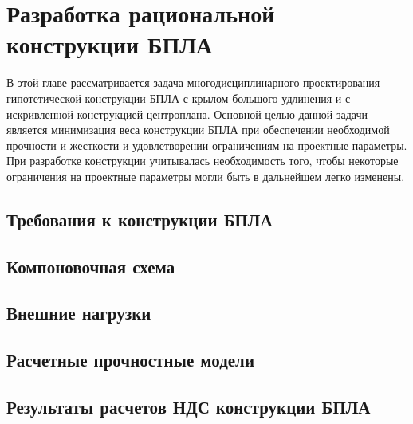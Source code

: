 \chapter{Разработка рациональной конструкции БПЛА}

В этой главе рассматривается задача многодисциплинарного проектирования гипотетической конструкции БПЛА с крылом большого удлинения и с искривленной конструкцией центроплана.  Основной целью данной задачи является минимизация веса конструкции БПЛА при обеспечении необходимой прочности и жесткости и удовлетворении ограничениям на проектные параметры. При разработке конструкции учитывалась необходимость того, чтобы некоторые ограничения на проектные параметры могли быть в дальнейшем легко изменены.


\section{Требования к конструкции БПЛА}



\section{Компоновочная схема}
	

\section{Внешние нагрузки}
\label{sec:externalLoads}



\section{Расчетные прочностные модели}




\section{Результаты расчетов НДС конструкции БПЛА} 


%